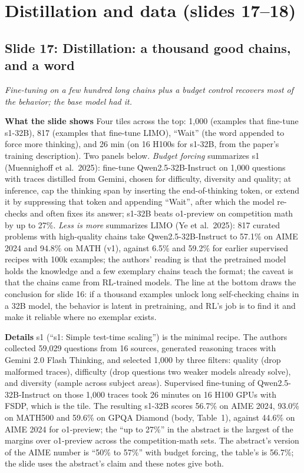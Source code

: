 \documentclass[11pt,letterpaper]{article}
\newcommand{\slide}[3]{%
  \subsection[Slide #1: #2]{Slide #1: #2}%
  {\color{muted}\itshape #3\par}\medskip}
\newcommand{\para}[1]{\medskip\noindent\textbf{#1}\quad}
\begin{document}
\section{Distillation and data (slides 17--18)}

\slide{17}{Distillation: a thousand good chains, and a word}{Fine-tuning on a few hundred long chains plus a budget control recovers most of the behavior; the base model had it.}

\para{What the slide shows} Four tiles across the top: 1,000 (examples that fine-tune s1-32B), 817 (examples that fine-tune LIMO), ``Wait'' (the word appended to force more thinking), and 26 min (on 16 H100s for s1-32B, from the paper's training description). Two panels below. \emph{Budget forcing} summarizes s1 (Muennighoff et al.\ 2025): fine-tune Qwen2.5-32B-Instruct on 1,000 questions with traces distilled from Gemini, chosen for difficulty, diversity and quality; at inference, cap the thinking span by inserting the end-of-thinking token, or extend it by suppressing that token and appending ``Wait'', after which the model re-checks and often fixes its answer; s1-32B beats o1-preview on competition math by up to 27\%. \emph{Less is more} summarizes LIMO (Ye et al.\ 2025): 817 curated problems with high-quality chains take Qwen2.5-32B-Instruct to 57.1\% on AIME 2024 and 94.8\% on MATH (v1), against 6.5\% and 59.2\% for earlier supervised recipes with 100k examples; the authors' reading is that the pretrained model holds the knowledge and a few exemplary chains teach the format; the caveat is that the chains came from RL-trained models. The line at the bottom draws the conclusion for slide 16: if a thousand examples unlock long self-checking chains in a 32B model, the behavior is latent in pretraining, and RL's job is to find it and make it reliable where no exemplar exists.

\para{Details} s1 (``s1: Simple test-time scaling'') is the minimal recipe. The authors collected 59,029 questions from 16 sources, generated reasoning traces with Gemini 2.0 Flash Thinking, and selected 1,000 by three filters: quality (drop malformed traces), difficulty (drop questions two weaker models already solve), and diversity (sample across subject areas). Supervised fine-tuning of Qwen2.5-32B-Instruct on those 1,000 traces took 26 minutes on 16 H100 GPUs with FSDP, which is the tile. The resulting s1-32B scores 56.7\% on AIME 2024, 93.0\% on MATH500 and 59.6\% on GPQA Diamond (body, Table~1), against 44.6\% on AIME 2024 for o1-preview; the ``up to 27\%'' in the abstract is the largest of the margins over o1-preview across the competition-math sets. The abstract's version of the AIME number is ``50\% to 57\%'' with budget forcing, the table's is 56.7\%; the slide uses the abstract's claim and these notes give both.
\end{document}
